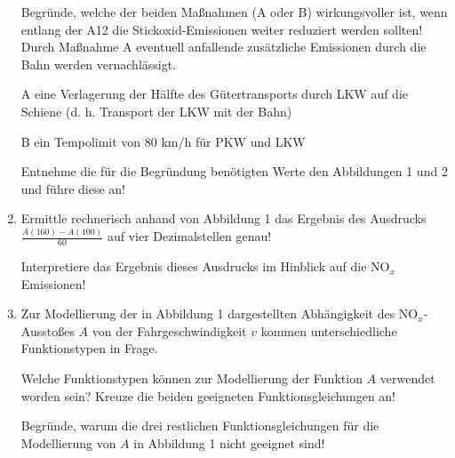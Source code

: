 \begin{langesbeispiel}
\begin{enumerate}
Begründe, welche der beiden Maßnahmen (A oder B) wirkungsvoller ist, wenn entlang der A12 die Stickoxid-Emissionen weiter reduziert werden sollten! Durch Maßnahme A eventuell anfallende zusätzliche Emissionen durch die Bahn werden vernachlässigt.

\hspace*{1cm}A\hspace*{1cm} eine Verlagerung der Hälfte des Gütertransports durch LKW \hspace*{2.3cm} auf die Schiene (d. h. Transport der LKW mit der Bahn)

\hspace*{1cm}B\hspace*{1cm} ein Tempolimit von 80 km/h für PKW und LKW

Entnehme die für die Begründung benötigten Werte den Abbildungen 1 und 2 und 
führe diese an!

\item Ermittle rechnerisch anhand von Abbildung 1 das Ergebnis des Ausdrucks $\frac{A(160)-A(100)}{60}$ auf vier Dezimalstellen genau!

Interpretiere das Ergebnis dieses Ausdrucks im Hinblick auf die $\text{NO}_x$Emissionen!

\item Zur Modellierung der in Abbildung 1 dargestellten Abhängigkeit des $\text{NO}_x$-Ausstoßes $A$ von der Fahrgeschwindigkeit $v$ kommen unterschiedliche Funktionstypen in Frage.

Welche Funktionstypen können zur Modellierung der Funktion $A$ verwendet worden sein? Kreuze die beiden geeigneten Funktionsgleichungen an!

				
				Begründe, warum die drei restlichen Funktionsgleichungen für die Modellierung von $A$ in Abbildung 1 nicht geeignet sind!
						

\end{enumerate}
\end{langesbeispiel}
